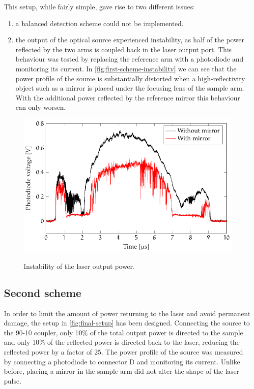 This setup, while fairly simple, gave rise to two different issues:
\begin{enumerate}
	\item a balanced detection scheme could not be implemented.
	
	\item the output of the optical source experienced instability, as half of the power reflected by the two arms is coupled back in the laser output port. This behaviour was tested by replacing the reference arm with a photodiode and monitoring its current. In \autoref{fig:first-scheme-instability} we can see that the power profile of the source is substantially distorted when a high-reflectivity object such as a mirror is placed under the focusing lens of the sample arm. With the additional power reflected by the reference mirror this behaviour can only worsen. 
	
	
\end{enumerate}
\begin{figure}[bth]
	\myfloatalign
	{\includegraphics[width=0.8\linewidth]{gfx/ch3/first-scheme-instability}}
	\caption{Instability of the laser output power.}\label{fig:first-scheme-instability}
\end{figure}




\subsection{Second scheme}
In order to limit the amount of power returning to the laser and avoid permanent damage, the setup in \autoref{fig:final-setup} has been designed. Connecting the source to the 90-10 coupler, only 10\% of the total output power is directed to the sample and only 10\% of the reflected power is directed back to the laser, reducing the reflected power by a factor of 25. The power profile of the source was measured by connecting a photodiode to connector D and monitoring its current. Unlike before, placing a mirror in the sample arm did not alter the shape of the laser pulse. 

